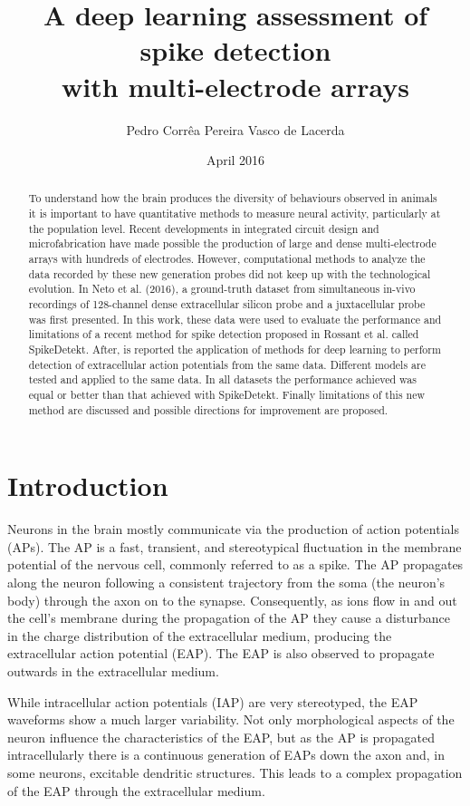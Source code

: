 \documentclass[10pt]{article}
\date{April 2016}
\title{A deep learning assessment of spike detection
\\ with multi-electrode arrays}
\author{Pedro Corrêa Pereira Vasco de Lacerda}
\begin{document}
\maketitle

\begin{abstract}

To understand how the brain produces the diversity of behaviours observed in animals it is important to have quantitative methods to measure neural activity, particularly at the population level. Recent developments in integrated circuit design and microfabrication have made possible the production of large and dense multi-electrode arrays with hundreds of electrodes. However, computational methods to analyze the data recorded by these new generation probes did not keep up with the technological evolution. In Neto et al. (2016), a ground-truth dataset from simultaneous in-vivo recordings of 128-channel dense extracellular silicon probe and a juxtacellular probe was first presented. In this work, these data were used to evaluate the performance and limitations of a recent method for spike detection proposed in Rossant et al. called SpikeDetekt. After, is reported the application of methods for deep learning to perform detection of extracellular action potentials from the same data. Different models are tested and applied to the same data. In all datasets the performance achieved was equal or better than that achieved with SpikeDetekt. Finally limitations of this new method are discussed and possible directions for improvement are proposed.
\end{abstract}

\section{Introduction}
Neurons in the brain mostly communicate via the production of action potentials (APs). The AP is a fast, transient, and stereotypical fluctuation in the membrane potential of the nervous cell, commonly referred to as a spike. The AP propagates along the neuron following a consistent trajectory from the soma (the neuron's body) through the axon on to the synapse. 
Consequently, as ions flow in and out the cell's membrane during the propagation of the AP they cause a disturbance in the charge distribution of the extracellular medium, producing the extracellular action potential (EAP). The EAP is also observed to propagate outwards in the extracellular medium. \cite{kandel}

While intracellular action potentials (IAP) are very stereotyped, the EAP waveforms show a much larger variability. Not only morphological aspects of the neuron influence the characteristics of the EAP, but as the AP is propagated intracellularly there is a continuous generation of EAPs down the axon and, in some neurons, excitable dendritic structures. This leads to a complex propagation of the EAP through the extracellular medium. \cite{gold2007biophysics} \cite{pettersen2008amplitude}
 
\end{document}

